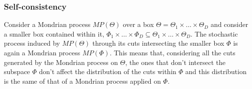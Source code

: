 \documentclass[a4paper]{article}
\begin{document}

\subsubsection*{Self-consistency}
Consider a Mondrian process $MP(\Theta)$ over a box $\Theta = \Theta_1 \times \ldots \times \Theta_D$ and consider a smaller box contained within it, $\Phi_1 \times \ldots \times \Phi_D \subseteq \Theta_1 \times \ldots \times \Theta_D$.
The stochastic process induced by $MP(\Theta)$ through its cuts intersecting the smaller box $\Phi$ is again a Mondrian process $MP(\Phi)$.
This means that, considering all the cuts generated by the Mondrian process on $\Theta$, the ones that don't intersect the subspace $\Phi$ don't affect the distribution of the cuts within $\Phi$ and this distribution is the same of that of a Mondrian process applied on $\Phi$.
\end{document}

